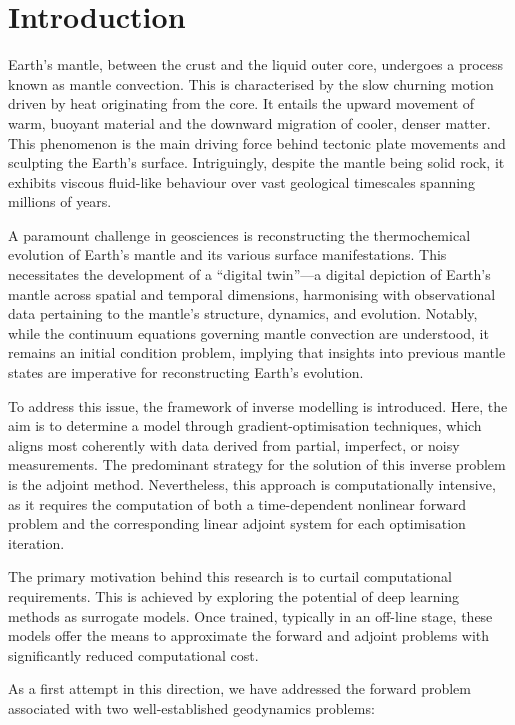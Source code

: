 \chapter{Introduction}

Earth's mantle, between the crust and the liquid outer core, undergoes a process known as mantle convection. This is characterised by the slow churning motion driven by heat originating from the core. It entails the upward movement of warm, buoyant material and the downward migration of cooler, denser matter. This phenomenon is the main driving force behind tectonic plate movements and sculpting the Earth's surface. Intriguingly, despite the mantle being solid rock, it exhibits viscous fluid-like behaviour over vast geological timescales spanning millions of years.

A paramount challenge in geosciences is reconstructing the thermochemical evolution of Earth's mantle and its various surface manifestations. This necessitates the development of a ``digital twin''—a digital depiction of Earth's mantle across spatial and temporal dimensions, harmonising with observational data pertaining to the mantle's structure, dynamics, and evolution. Notably, while the continuum equations governing mantle convection are understood, it remains an initial condition problem, implying that insights into previous mantle states are imperative for reconstructing Earth's evolution.

To address this issue, the framework of inverse modelling is introduced. Here, the aim is to determine a model through gradient-optimisation techniques, which aligns most coherently with data derived from partial, imperfect, or noisy measurements. The predominant strategy for the solution of this inverse problem is the adjoint method. Nevertheless, this approach is computationally intensive, as it requires the computation of both a time-dependent nonlinear forward problem and the corresponding linear adjoint system for each optimisation iteration.

The primary motivation behind this research is to curtail computational requirements. This is achieved by exploring the potential of deep learning methods as surrogate models. Once trained, typically in an off-line stage, these models offer the means to approximate the forward and adjoint problems with significantly reduced computational cost.

As a first attempt in this direction, we have addressed the forward problem associated with two well-established geodynamics problems: 

